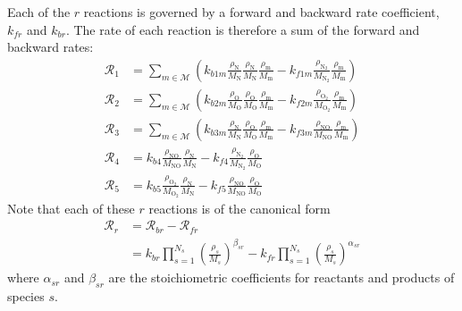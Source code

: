 Each of the $r$ reactions is governed by a forward and backward rate coefficient, $k_{fr}$ and $k_{br}$.  The rate of each reaction is therefore a sum of the forward and backward rates:
\begin{align*}
  \mathcal{R}_1 &= \sum_{m\in\mathcal{M}}\left(k_{b1m}\frac{\rho_{\text{N}}}{M_{\text{N}}}\frac{\rho_{\text{N}}}{M_{\text{N}}}\frac{\rho_{\text{m}}}{M_{\text{m}}} - k_{f1m}\frac{\rho_{\text{N}_2}}{M_{\text{N}_2}}\frac{\rho_{\text{m}}}{M_{\text{m}}} \right) \\  
  \mathcal{R}_2 &= \sum_{m\in\mathcal{M}}\left(k_{b2m}\frac{\rho_{\text{O}}}{M_{\text{O}}}\frac{\rho_{\text{O}}}{M_{\text{O}}}\frac{\rho_{\text{m}}}{M_{\text{m}}} - k_{f2m}\frac{\rho_{\text{O}_2}}{M_{\text{O}_2}}\frac{\rho_{\text{m}}}{M_{\text{m}}} \right) \\
  \mathcal{R}_3 &= \sum_{m\in\mathcal{M}}\left(k_{b3m}\frac{\rho_{\text{N}}}{M_{\text{N}}}\frac{\rho_{\text{O}}}{M_{\text{O}}}\frac{\rho_{\text{m}}}{M_{\text{m}}} - k_{f3m}\frac{\rho_{\text{NO}}}{M_{\text{NO}}}\frac{\rho_{\text{m}}}{M_{\text{m}}} \right) \\
  \mathcal{R}_4 &= k_{b4}\frac{\rho_{\text{NO}}}{M_{\text{NO}}}\frac{\rho_{\text{N}}}{M_{\text{N}}} - k_{f4}\frac{\rho_{\text{N}_2}}{M_{\text{N}_2}}\frac{\rho_{\text{O}}}{M_{\text{O}}} \\
  \mathcal{R}_5 &= k_{b5}\frac{\rho_{\text{O}_2}}{M_{\text{O}_2}}\frac{\rho_{\text{N}}}{M_{\text{N}}} - k_{f5}\frac{\rho_{\text{NO}}}{M_{\text{NO}}}\frac{\rho_{\text{O}}}{M_{\text{O}}}
\end{align*}
Note that each of these $r$ reactions is of the canonical form
\begin{align}
  \mathcal{R}_r &=  \mathcal{R}_{br} - \mathcal{R}_{fr} \\
                &= k_{br} \prod_{s=1}^{N_s} \left(\frac{\rho_s}{M_s}\right)^{\beta_{sr}} - k_{fr} \prod_{s=1}^{N_s} \left(\frac{\rho_s}{M_s}\right)^{\alpha_{sr}}
\end{align}
where $\alpha_{sr}$ and $\beta_{sr}$ are the stoichiometric coefficients for reactants and products of species $s$.

